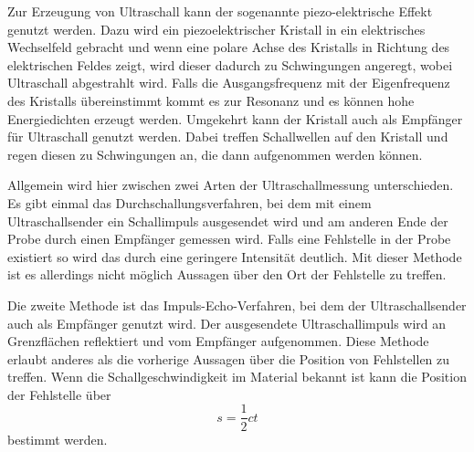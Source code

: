     Zur Erzeugung von Ultraschall kann der sogenannte piezo-elektrische Effekt 
    genutzt werden. Dazu wird ein piezoelektrischer Kristall in ein elektrisches 
    Wechselfeld gebracht und wenn eine polare Achse des Kristalls in Richtung 
    des elektrischen Feldes zeigt, wird dieser dadurch zu Schwingungen angeregt,
    wobei Ultraschall abgestrahlt wird. Falls die Ausgangsfrequenz mit der 
    Eigenfrequenz des Kristalls übereinstimmt kommt es zur Resonanz und es können
    hohe Energiedichten erzeugt werden. Umgekehrt kann der Kristall auch als 
    Empfänger für Ultraschall genutzt werden. Dabei treffen Schallwellen auf den 
    Kristall und regen diesen zu Schwingungen an, die dann aufgenommen werden 
    können. 


    Allgemein wird hier zwischen zwei Arten der Ultraschallmessung unterschieden.
    Es gibt einmal das Durchschallungsverfahren, bei dem mit einem 
    Ultraschallsender ein Schallimpuls ausgesendet wird und am anderen 
    Ende der Probe durch einen Empfänger gemessen wird. Falls eine Fehlstelle
    in der Probe existiert so wird das durch eine geringere Intensität deutlich.
    Mit dieser Methode ist es allerdings nicht möglich Aussagen über 
    den Ort der Fehlstelle zu treffen.


    Die zweite Methode ist das Impuls-Echo-Verfahren, bei dem 
    der Ultraschallsender auch als Empfänger genutzt wird. 
    Der ausgesendete Ultraschallimpuls wird an Grenzflächen reflektiert
    und vom Empfänger aufgenommen. Diese Methode erlaubt anderes als die vorherige 
    Aussagen über die Position von Fehlstellen zu treffen.
    Wenn die Schallgeschwindigkeit im Material bekannt ist kann die Position der 
    Fehlstelle über 
    \begin{equation}
    \label{eqn:fehlstelle}
        s=\frac{1}{2} c t
    \end{equation}
    bestimmt werden.

